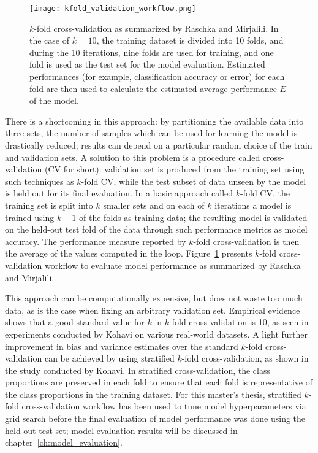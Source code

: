 \begin{figure}[hbt!]
    \centering
    \texttt{[image: kfold\_validation\_workflow.png]}
    \caption{$k$-fold cross-validation as summarized by Raschka and Mirjalili\cite{RaschkaMirjalili2017}.
    In the case of $k=10$, the training dataset is divided into 10 folds, and during the 10 iterations, nine folds are used for training, and one fold is used as the test set for the model evaluation.
    Estimated performances (for example, classification accuracy or error) for each fold are then used to calculate the estimated average performance $E$ of the model.}
    \label{fig:kfold_validation_workflow}
\end{figure}

There is a shortcoming in this approach: by partitioning the available data into three sets, the number of samples which can be used for learning the model is drastically reduced;
results can depend on a particular random choice of the train and validation sets.
A solution to this problem is a procedure called cross-validation (CV for short): validation set is produced from the training set using such techniques as $k$-fold CV, while the test subset of data unseen by the model is held out for its final evaluation.
In a basic approach called $k$-fold CV, the training set is split into $k$ smaller sets and on each of $k$ iterations a model is trained using $k-1$ of the folds as training data;
the resulting model is validated on the held-out test fold of the data through such performance metrics as model accuracy.
The performance measure reported by $k$-fold cross-validation is then the average of the values computed in the loop.
Figure~\ref{fig:kfold_validation_workflow} presents $k$-fold cross-validation workflow to evaluate model performance as summarized by Raschka and Mirjalili\cite{RaschkaMirjalili2017}.

This approach can be computationally expensive, but does not waste too much data, as is the case when fixing an arbitrary validation set.
Empirical evidence shows that a good standard value for $k$ in $k$-fold cross-validation is 10, as seen in experiments conducted by Kohavi on various real-world datasets\cite{Kohavi1995}.
A light further improvement in bias and variance estimates over the standard $k$-fold cross-validation can be achieved by using stratified $k$-fold cross-validation, as shown in the study conducted by Kohavi.
In stratified cross-validation, the class proportions are preserved in each fold to ensure that each fold is representative of the class proportions in the training dataset.
For this master's thesis, stratified $k$-fold cross-validation workflow has been used to tune model hyperparameters via grid search before the final evaluation of model performance was done using the held-out test set;
model evaluation results will be discussed in chapter~\ref{ch:model_evaluation}.

